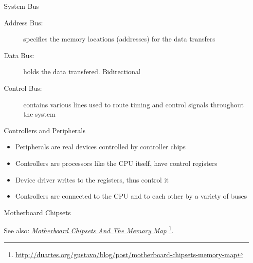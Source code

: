 \begin{frame}{System Bus}
  \centering
  \mode<beamer>{ \texttt{[image: mos-figs-1-5]} }%

  \begin{description}
  \item[Address Bus:] specifies the memory locations (addresses) for the
    data transfers
  \item[Data Bus:] holds the data transfered. Bidirectional
  \item[Control Bus:] contains various lines used to route timing and
    control signals throughout the system
  \end{description}
\end{frame}

\begin{frame}{Controllers and Peripherals}
  \begin{itemize}
  \item Peripherals are real devices controlled by controller chips
  \item Controllers are processors like the CPU itself, have control registers
  \item Device driver writes to the registers, thus control it
  \item Controllers are connected to the CPU and to each other by a variety of buses
  \end{itemize}
\end{frame}

\begin{frame}
  \centering
\end{frame}

\begin{frame}{Motherboard Chipsets}
  \centering
\end{frame}

See also:
\href{http://duartes.org/gustavo/blog/post/motherboard-chipsets-memory-map}{\emph{Motherboard
    Chipsets And The Memory Map}}
\footnote{\url{http://duartes.org/gustavo/blog/post/motherboard-chipsets-memory-map}}.

